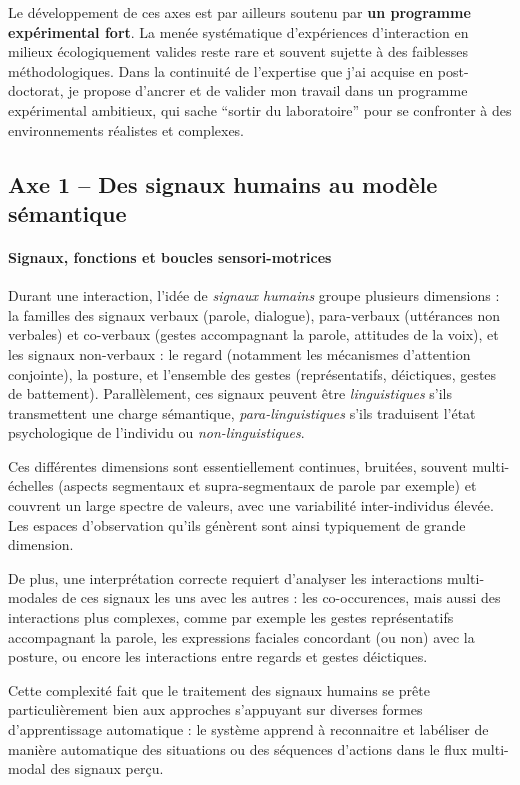 \documentclass[a4paper]{article}
\begin{document}
Le développement de ces axes est par ailleurs soutenu par \textbf{un programme
expérimental fort}. La menée systématique d'expériences d'interaction en milieux
écologiquement valides reste rare et souvent sujette à des faiblesses
méthodologiques.  Dans la continuité de l'expertise que j'ai acquise en
post-doctorat, je propose d'ancrer et de valider mon travail dans un programme
expérimental ambitieux, qui sache ``sortir du laboratoire'' pour se confronter à
des environnements réalistes et complexes.

\subsection*{Axe 1 -- Des signaux humains au modèle sémantique}

\paragraph{Signaux, fonctions et boucles sensori-motrices}

Durant une interaction, l'idée de \emph{signaux humains} groupe plusieurs
dimensions : la familles des signaux verbaux (parole, dialogue), para-verbaux
(uttérances non verbales) et co-verbaux (gestes accompagnant la parole,
attitudes de la voix), et les signaux non-verbaux : le regard (notamment les
mécanismes d'attention conjointe), la posture, et l'ensemble des gestes
(représentatifs, déictiques, gestes de battement). Parallèlement, ces signaux
peuvent être \emph{linguistiques} s'ils transmettent une charge sémantique,
\emph{para-linguistiques} s'ils traduisent l'état psychologique de l'individu ou
\emph{non-linguistiques}.

Ces différentes dimensions sont essentiellement continues, bruitées, souvent
multi-échelles (aspects segmentaux et supra-segmentaux de parole par exemple) et
couvrent un large spectre de valeurs, avec une variabilité inter-individus
élevée. Les espaces d'observation qu'ils génèrent sont ainsi typiquement de
grande dimension.

De plus, une interprétation correcte requiert d'analyser les interactions
multi-modales de ces signaux les uns avec les autres : les co-occurences, mais
aussi des interactions plus complexes, comme par exemple les gestes représentatifs
accompagnant la parole, les expressions faciales concordant (ou non) avec la
posture, ou encore les interactions entre regards et gestes déictiques.

Cette complexité fait que le traitement des signaux humains se prête
particulièrement bien aux approches s'appuyant sur diverses formes
d'apprentissage automatique : le système apprend à reconnaitre et labéliser de
manière automatique des situations ou des séquences d'actions dans le flux
multi-modal des signaux perçu.
\end{document}
